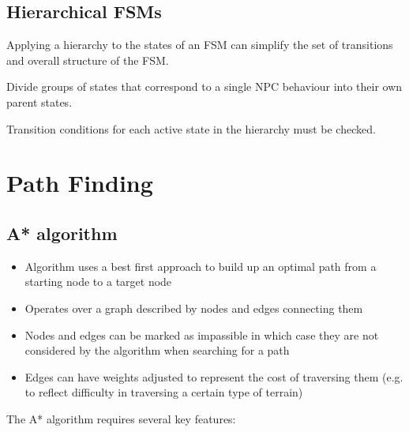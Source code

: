 \documentclass[a4paper]{article}
\begin{document}
\subsection{Hierarchical FSMs}

Applying a hierarchy to the states of an FSM can simplify the set of transitions
and overall structure of the FSM.

Divide groups of states that correspond to a single NPC behaviour into their own
parent states.

Transition conditions for each active state in the hierarchy must be checked.

\section{Path Finding}
\label{sec:path_finding}

\subsection{A* algorithm}

\begin{itemize}
  \item
    Algorithm uses a best first approach to build up an optimal path from a
    starting node to a target node

  \item
    Operates over a graph described by nodes and edges connecting them

  \item
    Nodes and edges can be marked as impassible in which case they are not
    considered by the algorithm when searching for a path

  \item
    Edges can have weights adjusted to represent the cost of traversing them
    (e.g. to reflect difficulty in traversing a certain type of terrain)
\end{itemize}

The A* algorithm requires several key features:
\end{document}
